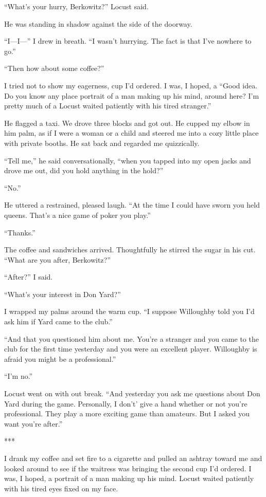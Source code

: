 \documentclass{novel}
\begin{document}
{“What’s your hurry, Berkowitz?” Locust said.

He was standing in shadow against the side of the doorway.

“I—I—” I drew in breath. “I wasn’t hurrying. The fact is that I’ve nowhere to go.”

“Then how about some coffee?”

I tried not to show my eagerness, cup I’d ordered. I was, I hoped, a “Good idea. Do you know any place portrait of a man making up his mind, around here? I’m pretty much of a Locust waited patiently with his tired stranger.”

He flagged a taxi. We drove three blocks and got out. He cupped my elbow in him palm, as if I were a woman or a child and steered me into a cozy little place with private booths. He sat back and regarded me quizzically.

“Tell me,” he said conversationally, “when you tapped into my open jacks and drove me out, did you hold anything in the hold?”

“No.”

He uttered a restrained, pleased laugh. “At the time I could have sworn you held queens. That’s a nice game of poker you play.”

“Thanks.”

The coffee and sandwiches arrived. Thoughtfully he stirred the sugar in his cut. “What are you after, Berkowitz?”

“After?” I said.

“What’s your interest in Don Yard?”

I wrapped my palms around the warm cup. “I suppose Willoughby told you I’d ask him if Yard came to the club.”

“And that you questioned him about me. You’re a stranger and you came to the club for the first time yesterday and you were an excellent player. Willoughby is afraid you might be a professional.”

“I’m no.”

Locust went on with out break. “And yesterday you ask me questions about Don Yard during the game. Personally, I don’t’ give a hand whether or not you’re professional. They play a more exciting game than amateurs. But I asked you want you’re after.”

***

I drank my coffee and set fire to a cigarette and pulled an ashtray toward me and looked around to see if the waitress was bringing the second cup I’d ordered. I was, I hoped, a portrait of a man making up his mind. Locust waited patiently with his tired eyes fixed on my face.

}
\end{document}
